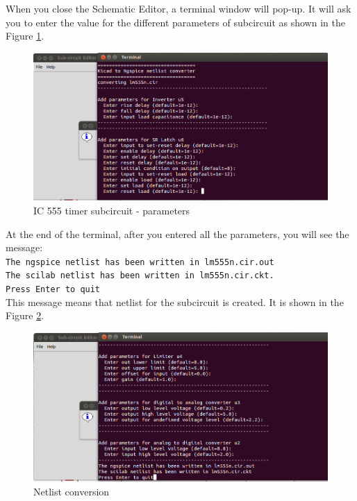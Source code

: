 When you close the Schematic Editor, a terminal window will pop-up. It will ask you to enter the value for the different parameters of subcircuit as shown in the Figure \ref{para}.

\begin{figure}[t]%
\begin{center}
\includegraphics[width=1\linewidth]{figures/subcircuit-parameters.png}%
\caption{IC 555 timer subcircuit - parameters}
\label{para}
\end{center}
\end{figure}

At the end of the terminal, after you entered all the parameters, you will see the message: \\{\tt The ngspice netlist has been written in lm555n.cir.out\\
The scilab netlist has been written in lm555n.cir.ckt.\\
Press Enter to quit}\\ 
This message means that netlist for the subcircuit is created. It is shown in the Figure \ref{net}.

\begin{figure}[t]%
\begin{center}
\includegraphics[width=1\linewidth]{figures/netlist-generation.png}%
\caption{Netlist conversion}
\label{net}
\end{center}
\end{figure}

